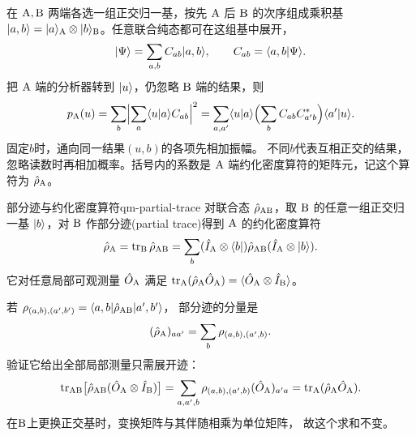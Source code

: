 在 $\mathrm{A},\mathrm{B}$ 两端各选一组正交归一基，按先 $\mathrm{A}$ 后 $\mathrm{B}$ 的次序组成乘积基 $\lvert a,b\rangle = \lvert a\rangle_{\mathrm{A}} \otimes \lvert b\rangle_{\mathrm{B}}$。任意联合纯态都可在这组基中展开，
\begin{equation}\label{eq:qm-bipartite-amplitudes}
    \lvert\Psi\rangle = \sum_{a,b}C_{ab}\lvert a,b\rangle,\qquad C_{ab} = \langle a,b\vert\Psi\rangle.
\end{equation}
把 $\mathrm{A}$ 端的分析器转到 $\lvert u\rangle$，仍忽略 $\mathrm{B}$ 端的结果，则
\begin{equation}
    p_{\mathrm{A}}(u) = \sum_b\Bigl\lvert\sum_a\langle u\vert a\rangle C_{ab}\Bigr\rvert^2
    = \sum_{a,a'}\langle u\vert a\rangle
        \Bigl(\sum_b C_{ab}C_{a'b}^\ast\Bigr)\langle a'\vert u\rangle.
\end{equation}
固定$b$时，通向同一结果$(u,b)$的各项先相加振幅。
不同$b$代表互相正交的结果，忽略读数时再相加概率。括号内的系数是 $\mathrm{A}$ 端约化密度算符的矩阵元，记这个算符为 $\hat{\rho}_{\mathrm{A}}$。
\begin{definition}[unbreakable]{部分迹与约化密度算符}{qm-partial-trace}
    对联合态 $\hat{\rho}_{\mathrm{AB}}$，取 $\mathrm{B}$ 的任意一组正交归一基 $\lvert b\rangle$，对 $\mathrm{B}$ 作部分迹(partial trace)得到 $\mathrm{A}$ 的约化密度算符
    \begin{equation}
        \hat{\rho}_{\mathrm{A}} = \operatorname{tr}_{\mathrm{B}}\hat{\rho}_{\mathrm{AB}}
        = \sum_b(\hat{I}_{\mathrm{A}} \otimes \langle b\rvert)\hat{\rho}_{\mathrm{AB}}(\hat{I}_{\mathrm{A}} \otimes \lvert b\rangle).
    \end{equation}
    它对任意局部可观测量 $\hat{O}_{\mathrm{A}}$ 满足 $\operatorname{tr}_{\mathrm{A}}(\hat{\rho}_{\mathrm{A}} \hat{O}_{\mathrm{A}}) = \langle\hat{O}_{\mathrm{A}} \otimes \hat{I}_{\mathrm{B}}\rangle$。
\end{definition}

若
$\rho_{(a,b),(a',b')} = \langle a,b\vert\hat{\rho}_{\mathrm{AB}}\vert a',b'\rangle$，
部分迹的分量是
\begin{equation}
    (\hat{\rho}_{\mathrm{A}})_{aa'} = \sum_b\rho_{(a,b),(a',b)}.
\end{equation}
验证它给出全部局部测量只需展开迹：
\begin{equation}
    \operatorname{tr}_{\mathrm{AB}}\bigl[\hat{\rho}_{\mathrm{AB}}(\hat{O}_{\mathrm{A}} \otimes \hat{I}_{\mathrm{B}})\bigr]
    = \sum_{a,a',b}\rho_{(a,b),(a',b)}(\hat{O}_{\mathrm{A}})_{a'a}
    = \operatorname{tr}_{\mathrm{A}}(\hat{\rho}_{\mathrm{A}}\hat{O}_{\mathrm{A}}).
\end{equation}
在$\mathrm{B}$上更换正交基时，变换矩阵与其伴随相乘为单位矩阵，
故这个求和不变。

